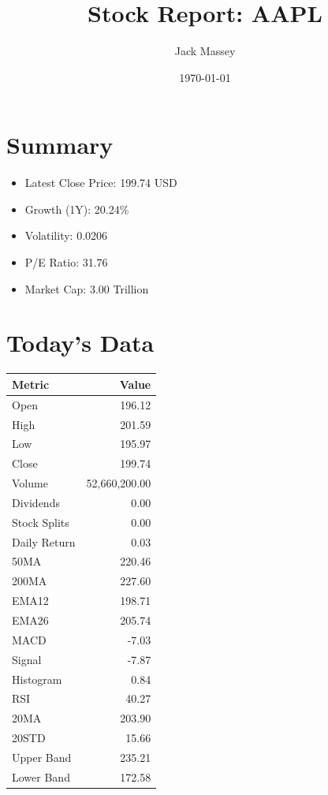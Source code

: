 \documentclass{article}
\title{Stock Report: AAPL}
\author{Jack Massey}
\date{\today}
\begin{document}
\maketitle

\section*{Summary}
\begin{itemize}
    \item Latest Close Price: 199.74 USD
    \item Growth (1Y): 20.24\%
    \item Volatility: 0.0206
    \item P/E Ratio: 31.76
    \item Market Cap: 3.00 Trillion
\end{itemize}

\section*{Today's Data}
\begin{tabular}{lr}\textbf{Metric} & \textbf{Value} \\
\hline
Open & 196.12 \\
High & 201.59 \\
Low & 195.97 \\
Close & 199.74 \\
Volume & 52,660,200.00 \\
Dividends & 0.00 \\
Stock Splits & 0.00 \\
Daily Return & 0.03 \\
50MA & 220.46 \\
200MA & 227.60 \\
EMA12 & 198.71 \\
EMA26 & 205.74 \\
MACD & -7.03 \\
Signal & -7.87 \\
Histogram & 0.84 \\
RSI & 40.27 \\
20MA & 203.90 \\
20STD & 15.66 \\
Upper Band & 235.21 \\
Lower Band & 172.58 \\
\end{tabular}
\end{document}
